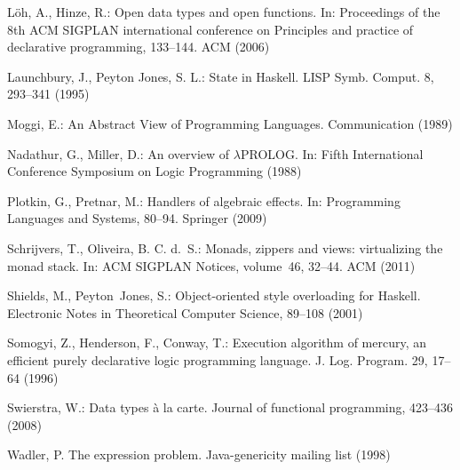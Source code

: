 \documentclass[runningheads,a4paper]{llncs}
\begin{document}
\begin{thebibliography}{4}
 L{\"o}h, A., Hinze, R.: Open data types and open functions. In: Proceedings of the 8th ACM SIGPLAN international conference
  on Principles and practice of declarative programming, 133--144. ACM (2006)
  
 Launchbury, J., Peyton Jones, S. L.: State in Haskell. LISP Symb. Comput. 8, 293--341 (1995)

 Moggi, E.: An Abstract View of Programming Languages. Communication (1989)

 Nadathur, G., Miller, D.: An overview of $\lambda$PROLOG. In: Fifth International Conference Symposium on Logic Programming (1988)

 Plotkin, G., Pretnar, M.: Handlers of algebraic effects. In: Programming Languages and Systems, 80--94. Springer (2009)

 Schrijvers, T., Oliveira, B. C. d.~S.: Monads, zippers and views: virtualizing the monad stack. In: ACM SIGPLAN Notices, volume~46, 32--44. ACM (2011)

 Shields, M., Peyton~Jones, S.: Object-oriented style overloading for Haskell. Electronic Notes in Theoretical Computer Science, 89--108 (2001)

 Somogyi, Z., Henderson, F., Conway, T.: Execution algorithm of mercury, an efficient purely declarative logic programming language. J. Log. Program. 29, 17--64 (1996)

 Swierstra, W.: Data types {\`a} la carte. Journal of functional programming, 423--436 (2008)

 Wadler, P. The expression problem. Java-genericity mailing list (1998)







\end{thebibliography}
\end{document}
